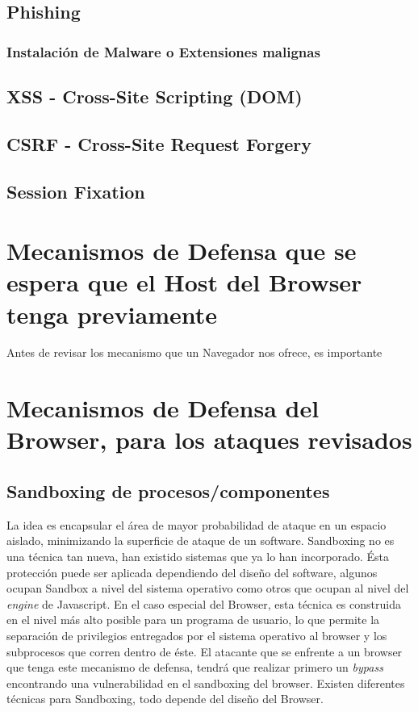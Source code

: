\subsection{Phishing}
	\subsubsection{Instalación de Malware o Extensiones malignas}

\subsection{XSS - Cross-Site Scripting (DOM)}

\subsection{CSRF - Cross-Site Request Forgery}

\subsection{Session Fixation}



\section{Mecanismos de Defensa que se espera que el Host del Browser tenga previamente}
	Antes de revisar los mecanismo que un Navegador nos ofrece, es importante 


\section{Mecanismos de Defensa del Browser, para los ataques revisados}

\subsection{Sandboxing de procesos/componentes}
    \label{chap3:Sandboxing}
    La idea es encapsular el área de mayor probabilidad de ataque en un espacio aislado, minimizando la superficie de ataque de un software. Sandboxing no es una técnica tan nueva, han existido sistemas que ya lo han incorporado. Ésta protección puede ser aplicada dependiendo del diseño del software, algunos ocupan Sandbox a nivel del sistema operativo como otros que ocupan al nivel del \textit{engine} de Javascript. En el caso especial del Browser, esta técnica es construida en el nivel más alto posible para un programa de usuario, lo que permite la separación de privilegios entregados por el sistema operativo al browser y los subprocesos que corren dentro de éste. El atacante que se enfrente a un browser que tenga este mecanismo de defensa, tendrá que realizar primero un \textit{bypass} encontrando una vulnerabilidad en el sandboxing del browser. Existen diferentes técnicas para Sandboxing, todo depende del diseño del Browser.

